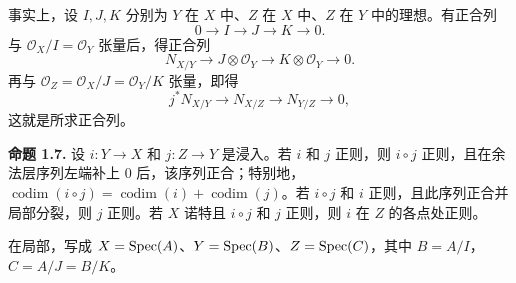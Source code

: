 事实上，设 \(I,J,K\) 分别为 \(Y\) 在 \(X\) 中、\(Z\) 在 \(X\) 中、\(Z\) 在 \(Y\) 中的理想。有正合列
\[
 0\longrightarrow I\longrightarrow J\longrightarrow K\longrightarrow0.
\]
与 \(\mathcal O_X/I=\mathcal O_Y\) 张量后，得正合列
\[
 N_{X/Y}\longrightarrow J\otimes\mathcal O_Y
 \longrightarrow K\otimes\mathcal O_Y\longrightarrow0.
\]
再与 \(\mathcal O_Z=\mathcal O_X/J=\mathcal O_Y/K\) 张量，即得
\[
 j^*N_{X/Y}\longrightarrow N_{X/Z}\longrightarrow N_{Y/Z}\longrightarrow0,
\]
这就是所求正合列。

\textbf{命题 1.7.} 设 \(i:Y\to X\) 和 \(j:Z\to Y\) 是浸入。若 \(i\) 和 \(j\) 正则，则 \(i\circ j\) 正则，且在余法层序列左端补上 \(0\) 后，该序列正合；特别地，\(\operatorname{codim}(i\circ j)=\operatorname{codim}(i)+\operatorname{codim}(j)\)。若 \(i\circ j\) 和 \(i\) 正则，且此序列正合并局部分裂，则 \(j\) 正则。若 \(X\) 诺特且 \(i\circ j\) 和 \(j\) 正则，则 \(i\) 在 \(Z\) 的各点处正则。

在局部，写成 \(X=\operatorname{Spec}(A)\)、\(Y=\operatorname{Spec}(B)\)、\(Z=\operatorname{Spec}(C)\)，其中 \(B=A/I\)，\(C=A/J=B/K\)。

